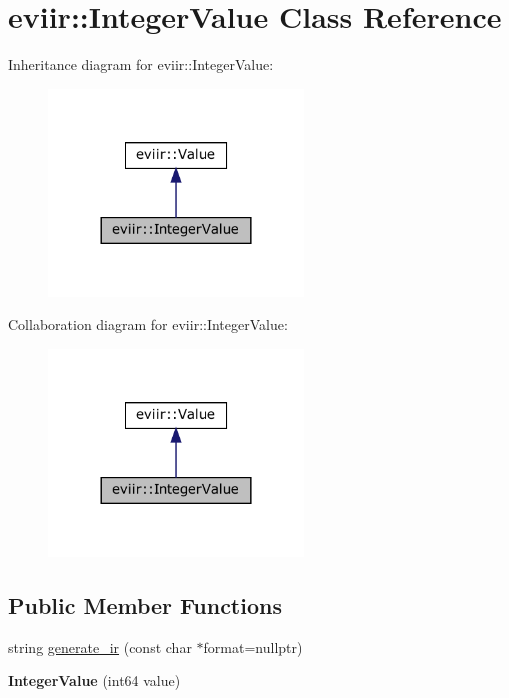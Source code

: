 \hypertarget{classeviir_1_1IntegerValue}{}\section{eviir\+:\+:Integer\+Value Class Reference}
\label{classeviir_1_1IntegerValue}


Inheritance diagram for eviir\+:\+:Integer\+Value\+:\nopagebreak
\begin{figure}[H]
\begin{center}
\leavevmode
\includegraphics[width=192pt]{classeviir_1_1IntegerValue__inherit__graph}
\end{center}
\end{figure}


Collaboration diagram for eviir\+:\+:Integer\+Value\+:\nopagebreak
\begin{figure}[H]
\begin{center}
\leavevmode
\includegraphics[width=192pt]{classeviir_1_1IntegerValue__coll__graph}
\end{center}
\end{figure}
\subsection*{Public Member Functions}
\begin{DoxyCompactItemize}
\item 
string \hyperlink{classeviir_1_1IntegerValue_a7f2653e23a8165a0eb43109d152cc0a2}{generate\+\_\+ir} (const char $\ast$format=nullptr)
\item 
\mbox{\label{classeviir_1_1IntegerValue_a3820420d866c81f5bd8151a745ddaf8a}} 
{\bfseries Integer\+Value} (int64 value)
\end{DoxyCompactItemize}
